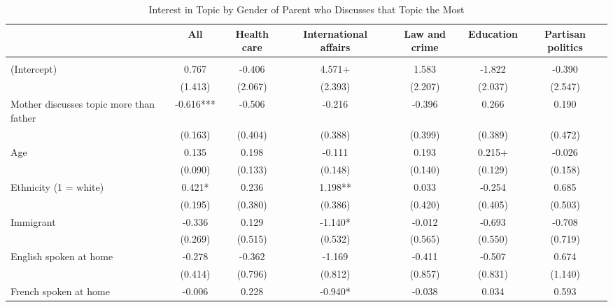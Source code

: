 \documentclass[
  letterpaper,
  DIV=11,
  numbers=noendperiod]{scrreprt}
\begin{document}
\begin{table}
\centering\centering
\caption{Interest in Topic by Gender of Parent who Discusses that Topic the Most \label{tab:lmeParentCtrl}}
\centering
\fontsize{6}{8}\selectfont
\begin{tabular}[t]{lcccccc}
\toprule
  & All & Health care & International affairs & Law and crime & Education & Partisan politics\\
\midrule
\addlinespace[0.5em]
\multicolumn{7}{l}{\textit{Boys}}\\
\midrule \hspace{1em}(Intercept) & 0.767 & -0.406 & 4.571+ & 1.583 & -1.822 & -0.390\\
\hspace{1em} & (1.413) & (2.067) & (2.393) & (2.207) & (2.037) & (2.547)\\
\hspace{1em}Mother discusses topic more than father & -0.616*** & -0.506 & -0.216 & -0.396 & 0.266 & 0.190\\
\hspace{1em} & (0.163) & (0.404) & (0.388) & (0.399) & (0.389) & (0.472)\\
\hspace{1em}Age & 0.135 & 0.198 & -0.111 & 0.193 & 0.215+ & -0.026\\
\hspace{1em} & (0.090) & (0.133) & (0.148) & (0.140) & (0.129) & (0.158)\\
\hspace{1em}Ethnicity (1 = white) & 0.421* & 0.236 & 1.198** & 0.033 & -0.254 & 0.685\\
\hspace{1em} & (0.195) & (0.380) & (0.386) & (0.420) & (0.405) & (0.503)\\
\hspace{1em}Immigrant & -0.336 & 0.129 & -1.140* & -0.012 & -0.693 & -0.708\\
\hspace{1em} & (0.269) & (0.515) & (0.532) & (0.565) & (0.550) & (0.719)\\
\hspace{1em}English spoken at home & -0.278 & -0.362 & -1.169 & -0.411 & -0.507 & 0.674\\
\hspace{1em} & (0.414) & (0.796) & (0.812) & (0.857) & (0.831) & (1.140)\\
\hspace{1em}French spoken at home & -0.006 & 0.228 & -0.940* & -0.038 & 0.034 & 0.593\\

\end{tabular}
\end{table}
\end{document}
